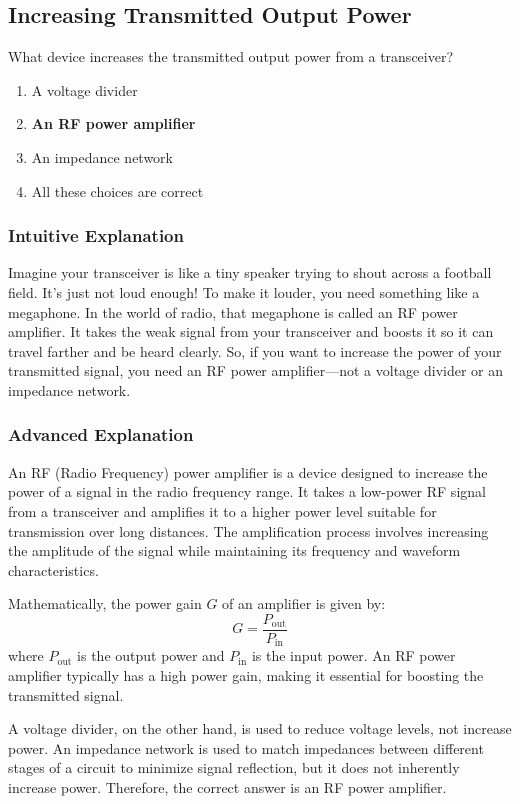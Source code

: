 \subsection{Increasing Transmitted Output Power}
\label{T7A10}

\begin{tcolorbox}[colback=gray!10!white,colframe=black!75!black,title=T7A10]
What device increases the transmitted output power from a transceiver?
\begin{enumerate}[label=\Alph*)]
    \item A voltage divider
    \item \textbf{An RF power amplifier}
    \item An impedance network
    \item All these choices are correct
\end{enumerate}
\end{tcolorbox}

\subsubsection*{Intuitive Explanation}
Imagine your transceiver is like a tiny speaker trying to shout across a football field. It’s just not loud enough! To make it louder, you need something like a megaphone. In the world of radio, that megaphone is called an RF power amplifier. It takes the weak signal from your transceiver and boosts it so it can travel farther and be heard clearly. So, if you want to increase the power of your transmitted signal, you need an RF power amplifier—not a voltage divider or an impedance network.

\subsubsection*{Advanced Explanation}
An RF (Radio Frequency) power amplifier is a device designed to increase the power of a signal in the radio frequency range. It takes a low-power RF signal from a transceiver and amplifies it to a higher power level suitable for transmission over long distances. The amplification process involves increasing the amplitude of the signal while maintaining its frequency and waveform characteristics.

Mathematically, the power gain \( G \) of an amplifier is given by:
\[
G = \frac{P_{\text{out}}}{P_{\text{in}}}
\]
where \( P_{\text{out}} \) is the output power and \( P_{\text{in}} \) is the input power. An RF power amplifier typically has a high power gain, making it essential for boosting the transmitted signal.

A voltage divider, on the other hand, is used to reduce voltage levels, not increase power. An impedance network is used to match impedances between different stages of a circuit to minimize signal reflection, but it does not inherently increase power. Therefore, the correct answer is an RF power amplifier.

